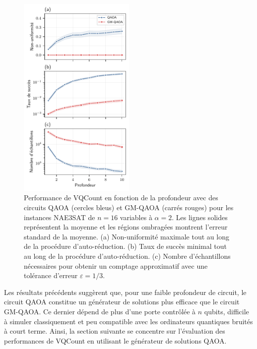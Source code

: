 \begin{figure}[ht!]
    \centering
    \includegraphics[width=0.5\textwidth]{figures/nae3sat-depth.pdf}
    \caption[Impact de la profondeur du circuit pour \#NAE3SAT]{Performance de VQCount en fonction de la profondeur avec des circuits QAOA (cercles bleus) et GM-QAOA (carrés rouges) pour les instances NAE3SAT de $n=16$ variables à $\alpha=2$. Les lignes solides représentent la moyenne et les régions ombragées montrent l'erreur standard de la moyenne. (a) Non-uniformité maximale tout au long de la procédure d'auto-réduction. (b) Taux de succès minimal tout au long de la procédure d'auto-réduction. (c) Nombre d'échantillons nécessaires pour obtenir un comptage approximatif avec une tolérance d'erreur $\varepsilon = 1/3$.}
    \label{fig:nae3sat-depth}
\end{figure}

Les résultats précédents suggèrent que, pour une faible profondeur de circuit, le circuit QAOA constitue un générateur de solutions plus efficace que le circuit GM-QAOA. Ce dernier dépend de plus d'une porte contrôlée à $n$ qubits, difficile à simuler classiquement et peu compatible avec les ordinateurs quantiques bruités à court terme. Ainsi, la section suivante se concentre sur l'évaluation des performances de VQCount en utilisant le générateur de solutions QAOA.


